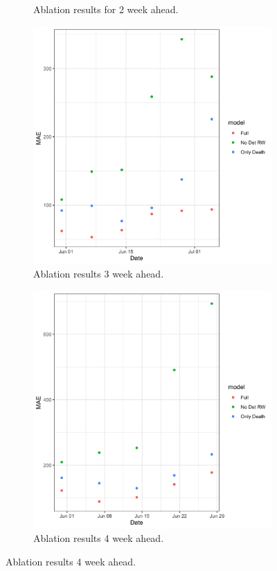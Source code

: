 \documentclass[11pt]{amsart}
\begin{document}
\begin{figure}
\begin{subfigure}{.5\textwidth}
    \caption{Ablation results for 2 week ahead.}
\end{subfigure}
\begin{subfigure}{.5\textwidth}
  \centering
    \includegraphics[scale=.15]{ablation_3.png}
    \caption{Ablation results 3 week ahead.}
\end{subfigure}%
\begin{subfigure}{.5\textwidth}
  \centering
    \includegraphics[scale=.15]{ablation_4.png}
    \caption{Ablation results 4 week ahead. }
\end{subfigure}


\end{figure}
\end{document}
